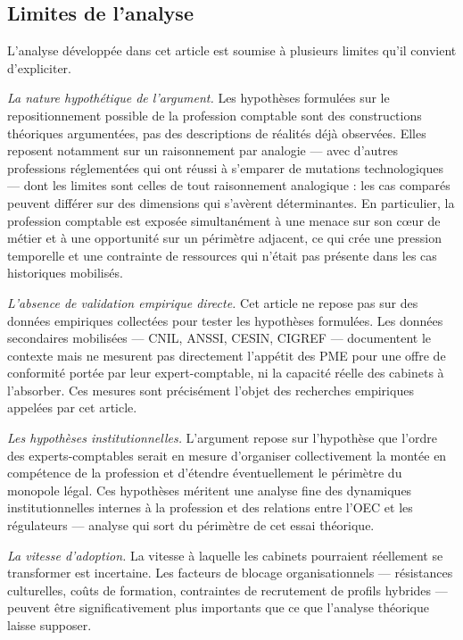 \documentclass[12pt,a4paper]{article}
\begin{document}
\subsection{Limites de l'analyse}

L'analyse développée dans cet article est soumise à plusieurs limites qu'il convient d'expliciter.

\textit{La nature hypothétique de l'argument.} Les hypothèses formulées sur le repositionnement possible de la profession comptable sont des constructions théoriques argumentées, pas des descriptions de réalités déjà observées. Elles reposent notamment sur un raisonnement par analogie — avec d'autres professions réglementées qui ont réussi à s'emparer de mutations technologiques — dont les limites sont celles de tout raisonnement analogique : les cas comparés peuvent différer sur des dimensions qui s'avèrent déterminantes. En particulier, la profession comptable est exposée simultanément à une menace sur son cœur de métier et à une opportunité sur un périmètre adjacent, ce qui crée une pression temporelle et une contrainte de ressources qui n'était pas présente dans les cas historiques mobilisés.

\textit{L'absence de validation empirique directe.} Cet article ne repose pas sur des données empiriques collectées pour tester les hypothèses formulées. Les données secondaires mobilisées — CNIL, ANSSI, CESIN, CIGREF — documentent le contexte mais ne mesurent pas directement l'appétit des PME pour une offre de conformité portée par leur expert-comptable, ni la capacité réelle des cabinets à l'absorber. Ces mesures sont précisément l'objet des recherches empiriques appelées par cet article.

\textit{Les hypothèses institutionnelles.} L'argument repose sur l'hypothèse que l'ordre des experts-comptables serait en mesure d'organiser collectivement la montée en compétence de la profession et d'étendre éventuellement le périmètre du monopole légal. Ces hypothèses méritent une analyse fine des dynamiques institutionnelles internes à la profession et des relations entre l'OEC et les régulateurs — analyse qui sort du périmètre de cet essai théorique.

\textit{La vitesse d'adoption.} La vitesse à laquelle les cabinets pourraient réellement se transformer est incertaine. Les facteurs de blocage organisationnels — résistances culturelles, coûts de formation, contraintes de recrutement de profils hybrides — peuvent être significativement plus importants que ce que l'analyse théorique laisse supposer.
\end{document}
